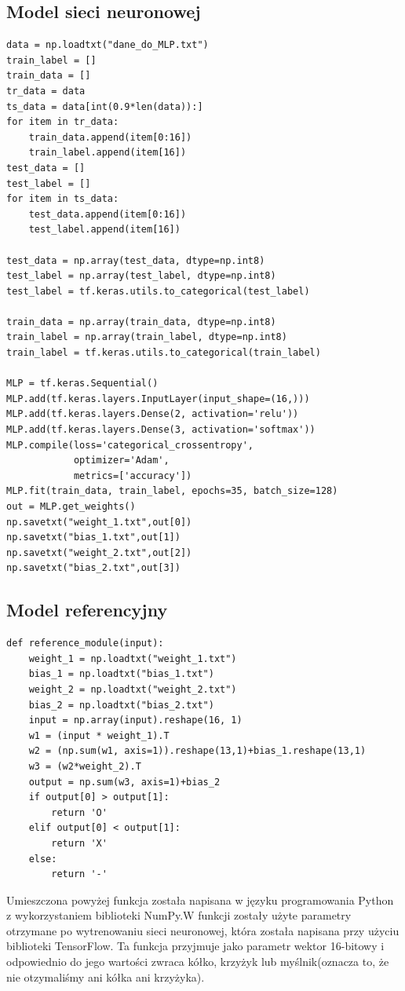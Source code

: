\documentclass[a4paper, titleauthor]{mwart}
\begin{document}
\subsection{Model sieci neuronowej}
\begin{lstlisting}[frame=single]
data = np.loadtxt("dane_do_MLP.txt")
train_label = []
train_data = []
tr_data = data
ts_data = data[int(0.9*len(data)):]
for item in tr_data:
    train_data.append(item[0:16])
    train_label.append(item[16])
test_data = []
test_label = []
for item in ts_data:
    test_data.append(item[0:16])
    test_label.append(item[16])

test_data = np.array(test_data, dtype=np.int8)
test_label = np.array(test_label, dtype=np.int8)
test_label = tf.keras.utils.to_categorical(test_label)

train_data = np.array(train_data, dtype=np.int8)
train_label = np.array(train_label, dtype=np.int8)
train_label = tf.keras.utils.to_categorical(train_label)

MLP = tf.keras.Sequential()
MLP.add(tf.keras.layers.InputLayer(input_shape=(16,)))
MLP.add(tf.keras.layers.Dense(2, activation='relu'))
MLP.add(tf.keras.layers.Dense(3, activation='softmax'))
MLP.compile(loss='categorical_crossentropy',
            optimizer='Adam',
            metrics=['accuracy'])
MLP.fit(train_data, train_label, epochs=35, batch_size=128)
out = MLP.get_weights()
np.savetxt("weight_1.txt",out[0])
np.savetxt("bias_1.txt",out[1])
np.savetxt("weight_2.txt",out[2])
np.savetxt("bias_2.txt",out[3])
\end{lstlisting}
\subsection{Model referencyjny}



\begin{lstlisting}[frame=single]
 def reference_module(input):
    weight_1 = np.loadtxt("weight_1.txt")
    bias_1 = np.loadtxt("bias_1.txt")
    weight_2 = np.loadtxt("weight_2.txt")
    bias_2 = np.loadtxt("bias_2.txt")
    input = np.array(input).reshape(16, 1)
    w1 = (input * weight_1).T
    w2 = (np.sum(w1, axis=1)).reshape(13,1)+bias_1.reshape(13,1)
    w3 = (w2*weight_2).T
    output = np.sum(w3, axis=1)+bias_2
    if output[0] > output[1]:
        return 'O'
    elif output[0] < output[1]:
        return 'X'
    else:
        return '-'
\end{lstlisting}
Umieszczona powyżej funkcja została napisana w języku programowania Python z wykorzystaniem biblioteki NumPy.W funkcji zostały użyte parametry otrzymane po wytrenowaniu sieci neuronowej, która została napisana przy użyciu biblioteki TensorFlow. Ta funkcja przyjmuje jako parametr wektor 16-bitowy i odpowiednio do jego wartości zwraca kółko, krzyżyk lub myślnik(oznacza to, że nie otzymaliśmy  ani kółka ani krzyżyka).
\end{document}
